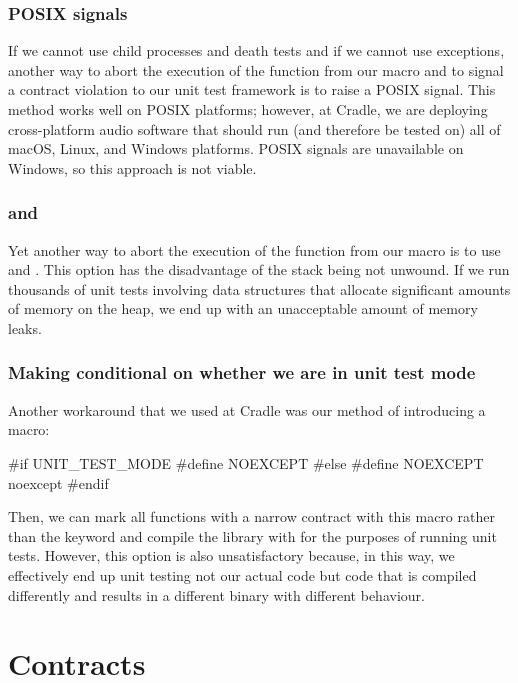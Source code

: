 \subsubsection{POSIX signals}

If we cannot use child processes and death tests and if we cannot use exceptions, another way to abort the execution of the function from our  macro and to signal a contract violation to our unit test framework is to raise a POSIX signal. This method works well on POSIX platforms; however, at Cradle, we are deploying cross-platform audio software that should run (and therefore be tested on) all of macOS, Linux, and Windows platforms. POSIX signals are unavailable on Windows, so this approach is not viable.

\subsubsection{ and }

Yet another way to abort the execution of the function from our  macro is to use  and . This option has the disadvantage of the stack being not unwound. If we run thousands of unit tests involving data structures that allocate significant amounts of memory on the heap, we end up with an unacceptable amount of memory leaks.

\subsubsection{Making  conditional on whether we are in unit test mode}

Another workaround that we used at Cradle was our method of introducing a macro:
\begin{codeblock}
#if UNIT_TEST_MODE
  #define NOEXCEPT 
#else
  #define NOEXCEPT noexcept
#endif
\end{codeblock}
Then, we can mark all functions with a narrow contract with this  macro rather than the  keyword and compile the library with  for the purposes of running unit tests. However, this option is also unsatisfactory because, in this way, we effectively end up unit testing not our actual code but code that is compiled differently and results in a different binary with different behaviour.

\section{Contracts}
\label{sec:contracts}

